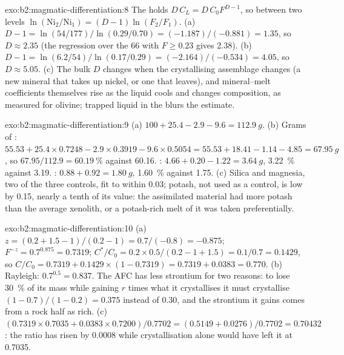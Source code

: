 \begin{solution}{exo:b2:magmatic-differentiation:8}
The  holds $D\,C_L = D\,C_0F^{D-1}$, so between two levels
$\ln(\mathrm{Ni}_2/\mathrm{Ni}_1) = (D - 1)\ln(F_2/F_1)$. (a) $D - 1 = \ln(54/177)/
\ln(0.29/0.70) = (-1.187)/(-0.881) = 1.35$, so $D \approx 2.35$ (the regression over
the 66  with $F \ge 0.23$ gives 2.38). (b) $D - 1 = \ln(6.2/54)/\ln(0.17/0.29) = (-2.164)/(-0.534)
= 4.05$, so $D \approx 5.05$. (c) The bulk $D$ changes when the crystallising
assemblage changes (a new mineral that takes up nickel, or one that leaves), and
mineral--melt coefficients themselves rise as the liquid cools and changes
composition, as measured for olivine; trapped liquid in the  blurs the
estimate.
\end{solution}

\begin{solution}{exo:b2:magmatic-differentiation:9}
(a) $100 + 25.4 - 2.9 - 9.6 = \qty{112.9}{g}$. (b) Grams of : $55.53 +
25.4\times0.7248 - 2.9\times0.3919 - 9.6\times0.5054 = 55.53 + 18.41 - 1.14 - 4.85 =
\qty{67.95}{g}$, so $67.95/112.9 = \qty{60.19}{\percent}$ against 60.16. :
$4.66 + 0.20 - 1.22 = \qty{3.64}{g}$, \qty{3.22}{\percent} against 3.19. :
$0.88 + 0.92 = \qty{1.80}{g}$, \qty{1.60}{\percent} against 1.75. (c) Silica and magnesia, two of the three
controls, fit to within 0.03; potash, not used as a control, is low by 0.15, nearly a
tenth of its value: the assimilated material had more potash than the average
xenolith, or a potash-rich melt of it was taken preferentially.
\end{solution}

\begin{solution}{exo:b2:magmatic-differentiation:10}
(a) $z = (0.2 + 1.5 - 1)/(0.2 - 1) = 0.7/(-0.8) = -0.875$; $F^{-z} = 0.7^{0.875} =
0.7319$; $C^*/C_0 = 0.2\times0.5/(0.2 - 1 + 1.5) = 0.1/0.7 = 0.1429$, so $C/C_0 =
0.7319 + 0.1429\times(1 - 0.7319) = 0.7319 + 0.0383 = 0.770$. (b) Rayleigh:
$0.7^{0.5} = 0.837$. The AFC  has less strontium for two reasons: to lose
\qty{30}{\percent} of its mass while gaining $r$ times what it crystallises it must
crystallise $(1 - 0.7)/(1 - 0.2) = 0.375$ instead of 0.30, and the strontium it gains
comes from a rock half as rich. (c) $(0.7319\times0.7035 + 0.0383\times0.7200)/0.7702
= (0.5149 + 0.0276)/0.7702 = 0.70432$: the ratio has risen by 0.0008 while
crystallisation alone would have left it at 0.7035.
\end{solution}

